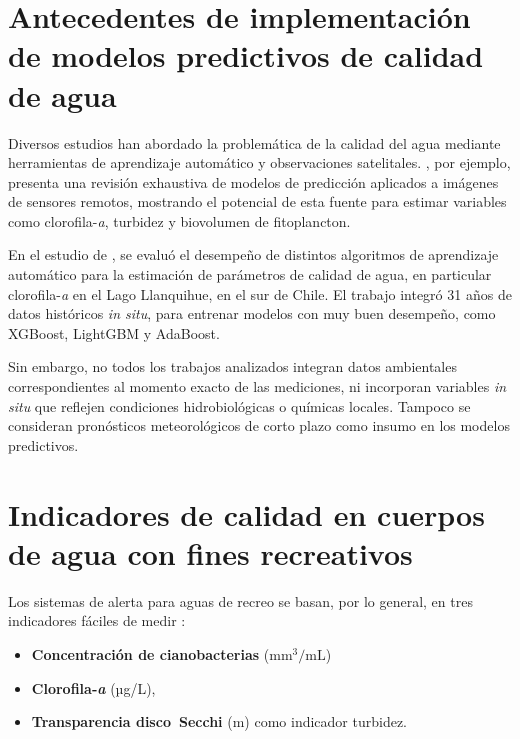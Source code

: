 \documentclass[
  11pt,
  pdftitle=TFI - Tschopp Joaquín S.,
  pdfauthor=Tschopp Joaquín S.,
  pdfcreator=LaTeX with hyperref,
]{report}  %
\begin{document}
\section{Antecedentes de implementación de modelos predictivos de calidad de agua}

Diversos estudios han abordado la problemática de la calidad del agua mediante herramientas de aprendizaje automático y observaciones satelitales. \cite{Schaeffer2024}, por ejemplo, presenta una revisión exhaustiva de modelos de predicción aplicados a imágenes de sensores remotos, mostrando el potencial de esta fuente para estimar variables como clorofila-\emph{a}, turbidez y biovolumen de fitoplancton. 

En el estudio de \cite{RodriguezLopez2023}, se evaluó el desempeño de distintos algoritmos de aprendizaje automático para la estimación de parámetros de calidad de agua, en particular clorofila-\emph{a} en el Lago Llanquihue, en el sur de Chile. El trabajo integró 31 años de datos históricos \textit{in situ}, para entrenar modelos con muy buen desempeño, como XGBoost, LightGBM y AdaBoost.

Sin embargo, no todos los trabajos analizados integran datos ambientales correspondientes al momento exacto de las mediciones, ni incorporan variables \textit{in situ} que reflejen condiciones hidrobiológicas o químicas locales. Tampoco se consideran pronósticos meteorológicos de corto plazo como insumo en los modelos predictivos.

\section{Indicadores de calidad en cuerpos de agua con fines recreativos }

Los sistemas de alerta para aguas de recreo se basan, por lo general,
en tres indicadores fáciles de medir \citep{WHO2021}:

\begin{itemize}[noitemsep]
  \item \textbf{Concentración de cianobacterias} ($\mathrm{mm^3}/\mathrm{mL}$)
  \item \textbf{Clorofila‑\emph{a}} (µg/L),
  \item \textbf{Transparencia disco Secchi} (m) como indicador turbidez.
\end{itemize}
\end{document}
